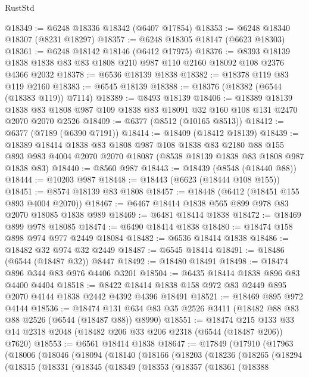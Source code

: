 \begin{lexlean}{RustStd}
\begin{coremodule}
@18349 := @6248 @18336 @18342 (@6407 @17854)
@18353 := @6248 @18340 @18307 (@8231 @18297)
@18357 := @6248 @18305 @18147 (@6623 @18303)
@18361 := @6248 @18142 @18146 (@6412 @17975)
@18376 := @8393 @18139 @1838 @1838 @83 @83 @1808 @210 @987 @110 @2160 @18092 @108 @2376 @4366 @2032
@18378 := @6536 @18139 @1838
@18382 := @18378 @119 @83 @119 @2160
@18383 := @6545 @18139
@18388 := @18376 (@18382 (@6544 (@18383 @119)) @7114)
@18389 := @8493 @18139
@18406 := @18389
    @18139
    @1838
    @83
    @1808
    @987
    @109
    @1838
    @83
    @18091
    @32
    @160
    @108
    @131
    @2470
    @2070
    @2070
    @2526
@18409 := @6377 (@8512 (@10165 @8513))
@18412 := @6377 (@7189 (@6390 @7191))
@18414 := @18409 (@18412 @18139)
@18439 := @18389
    @18414
    @1838
    @83
    @1808
    @987
    @108
    @1838
    @83
    @2180
    @88
    @155
    @893
    @983
    @4004
    @2070
    @2070
    @18087
    (@8538 @18139 @1838 @83 @1808 @987 @1838 @83)
@18440 := @8560 @987
@18443 := @18439 (@8548 (@18440 @88))
@18444 := @10203 @987
@18448 := @18443 (@6623 (@18444 @108 @155))
@18451 := @8574 @18139 @83 @1808
@18457 := @18448 (@6412 (@18451 @155 @893 @4004 @2070))
@18467 := @6467 @18414 @1838 @565 @899 @978 @83 @2070 @18085 @1838 @989
@18469 := @6481 @18414 @1838
@18472 := @18469 @899 @978 @18085
@18474 := @6490 @18414 @1838
@18480 := @18474 @158 @898 @974 @977 @2449 @18084
@18482 := @6536 @18414 @1838
@18486 := @18482 @32 @974 @32 @2449
@18487 := @6545 @18414
@18491 := @18486 (@6544 (@18487 @32)) @8447
@18492 := @18480 @18491
@18498 := @18474 @896 @344 @83 @976 @4406 @3201
@18504 := @6435 @18414 @1838 @896 @83 @4400 @4404
@18518 := @8422 @18414 @1838 @158 @972 @83 @2449 @895 @2070 @4144 @1838 @2442 @4392 @4396 @18491
@18521 := @18469 @895 @972 @4144
@18536 := @18474 @131 @634 @83 @35 @2526 @3411 (@18482 @88 @83 @88 @2526 (@6544 (@18487 @88)) @8990)
@18551 := @18474
    @215
    @133
    @33
    @14
    @2318
    @2048
    (@18482 @206 @33 @206 @2318 (@6544 (@18487 @206)) @7620)
@18553 := @6561 @18414 @1838
@18647 := @17849
    (@17910
      (@17963
        (@18006
          (@18046
            (@18094
              (@18140
                (@18166
                  (@18203
                    (@18236
                      (@18265
                        (@18294
                          (@18315
                            (@18331
                              (@18345
                                (@18349
                                  (@18353
                                    (@18357
                                      (@18361
                                        (@18388

\end{coremodule}
\end{lexlean}
